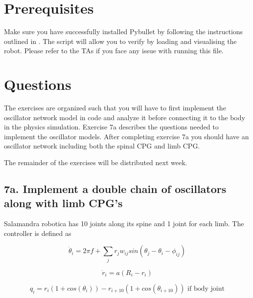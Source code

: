 \documentclass{cmc}
\begin{document}

\section*{Prerequisites}

Make sure you have successfully installed Pybullet by following the instructions
outlined in . The script
 will allow you to verify by loading and visualising
the robot. Please refer to the TAs if you face any issue with running this file.


\newpage

\section*{Questions}

The exercises are organized such that you will have to first implement the
oscillator network model in  code and analyze it before
connecting it to the body in the physics simulation.  Exercise 7a describes the
questions needed to implement the oscillator models. After completing exercise
7a you should have an oscillator network including both the spinal CPG and limb
CPG.

The remainder of the exercises will be distributed next week.


\subsection*{7a. Implement a double chain of oscillators along with
  limb CPG's}
\label{sec:implement-chain}

Salamandra robotica has 10 joints along its spine and 1 joint for each
limb. The controller is defined as

\begin{equation}
  \label{eq:dphase}
  \dot{\theta}_i = 2 \pi f + \sum_j r_j w_{ij} sin(\theta_j - \theta_i - \phi_{ij})
\end{equation}

\begin{equation}
  \label{eq:dr}
  \dot{r}_i = a (R_i - r_i)
\end{equation}

\begin{equation}
  \label{eq:output}
  q_i = r_i(1 + cos(\theta_i)) - r_{i+10}(1 + cos(\theta_{i+10})) \text{ if body joint}
\end{equation}
\end{document}
